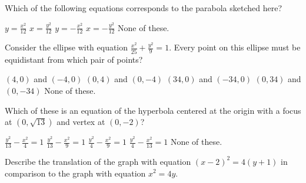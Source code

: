 \documentclass[12pt]{exam}
\newcommand{\<}{\langle}
\renewcommand{\>}{\rangle}
\begin{document}
\begin{questions}
\question[15]
Which of the following equations corresponds to the parabola sketched here?

\begin{center}
\end{center}

\begin{multicols}{2}
\begin{checkboxes}
  \choice \(y=\frac{x^2}{12}\)
  \choice \(x=\frac{y^2}{12}\)
  \choice \(y=-\frac{x^2}{12}\)
  \choice \(x=-\frac{y^2}{12}\)
  \choice None of these.
\end{checkboxes}
\end{multicols}

\vfill
\newpage


\question[15]
Consider the ellipse with equation \(\frac{x^2}{25}+\frac{y^2}{9}=1\).
Every point on this ellipse must be equidistant from which pair of points?

\begin{checkboxes}
  \choice \((4,0)\) and \((-4,0)\)
  \choice \((0,4)\) and \((0,-4)\)
  \choice \((34,0)\) and \((-34,0)\)
  \choice \((0,34)\) and \((0,-34)\)
  \choice None of these.
\end{checkboxes}

\vfill

\question[15]
Which of these is an equation of the hyperbola centered at the origin
with a focus at \((0,\sqrt{13})\) and vertex at \((0,-2)\)?

\begin{checkboxes}
  \choice \(\frac{y^2}{13}-\frac{x^2}{4}=1\)
  \choice \(\frac{y^2}{13}-\frac{x^2}{9}=1\)
  \choice \(\frac{y^2}{4}-\frac{x^2}{9}=1\)
  \choice \(\frac{y^2}{4}-\frac{x^2}{13}=1\)
  \choice None of these.
\end{checkboxes}

\vfill

\question[15]
Describe the translation of the graph with equation \((x-2)^2=4(y+1)\)
in comparison to the graph with equation \(x^2=4y\).


\end{questions}
\end{document}
